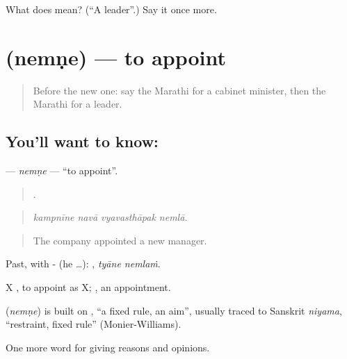 \begin{tcolorbox}[breakable,colback=teal!4,colframe=teal!35!black,title={Before you move on}]
What does  mean? (\textquotedblleft{}A leader\textquotedblright{}.) Say it once more.
\end{tcolorbox}
\section[\texorpdfstring{\mr{नेमणे} (nemṇe)}{नेमणे (nemṇe)}]{ (nemṇe) — to appoint}

\label{lesson:MR-C357-nemne}



\begin{quote}
Before the new one: say the Marathi for a cabinet minister, then the Marathi for a leader.
\end{quote}

\subsection*{You'll want to know: }
\textbf{} — \emph{nemṇe} — \textquotedblleft{}to appoint\textquotedblright{}.

\begin{quote}
   .
\end{quote}

\begin{quote}
\emph{kampnīne navā vyavasthāpak nemlā.}
\end{quote}

\begin{quote}
The company appointed a new manager.
\end{quote}

Past, with - (he …):  , \emph{tyāne nemlaṁ}.

X  , to appoint as X; , an appointment.

\begin{cousinweb}
\textbf{} (\emph{nemṇe}) is built on , \textquotedblleft{}a fixed rule, an aim\textquotedblright{}, usually traced to Sanskrit \emph{niyama}, \textquotedblleft{}restraint, fixed rule\textquotedblright{} (Monier-Williams).
\end{cousinweb}

\begin{grammarlens}[title={What you've built}]
One more word for giving reasons and opinions.
\end{grammarlens}

